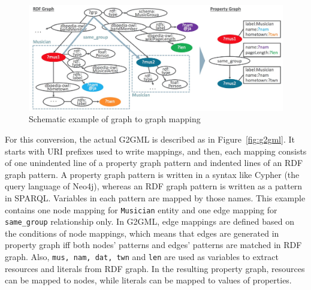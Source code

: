 \documentclass[runningheads]{llncs}
\begin{document}
\begin{figure}
\center
\includegraphics[width=1.0\textwidth]{example.jpg}
\caption{Schematic example of graph to graph mapping}
\label{fig:conversion}
\end{figure}

For this conversion, the actual G2GML is described as in Figure~\ref{fig:g2gml}. It starts with URI prefixes used to write mappings, and then, each mapping consists of one unindented line of a property graph pattern and indented lines of an RDF graph pattern. A property graph pattern is written in a syntax like Cypher (the query language of Neo4j), whereas an RDF graph pattern is written as a pattern in SPARQL. Variables in each pattern are mapped by those names. This example contains one node mapping for \texttt{Musician} entity and one edge mapping for \texttt{same\_group} relationship only. In G2GML, edge mappings are defined based on the conditions of node mappings, which means that edges are generated in property graph iff both nodes' patterns and edges' patterns are matched in RDF graph. Also, \texttt{mus, nam, dat, twn} and \texttt{len} are used as variables to extract resources and literals from RDF graph. In the resulting property graph, resources can be mapped to nodes, while literals can be mapped to values of properties.
\end{document}
